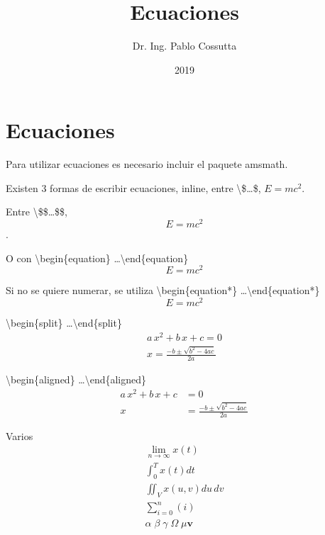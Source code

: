\documentclass[11pt, a4paper]{article}
\title{Ecuaciones}
\author{Dr. Ing. Pablo Cossutta}
\date{2019}
\begin{document}
\maketitle
\section{Ecuaciones}
Para utilizar ecuaciones es necesario incluir el paquete amsmath.

Existen 3 formas de escribir ecuaciones, inline, entre \textbackslash \$\dots \$, $E=mc^2$.

Entre \textbackslash \$\$\dots \$\$, $$E=mc^2$$.

O con \textbackslash begin\{equation\} \dots \textbackslash end\{equation\} 
\begin{equation}
	E=mc^2
\end{equation}

Si no se quiere numerar, se utiliza \textbackslash begin\{equation*\} \dots \textbackslash end\{equation*\} 
\begin{equation*}
	E=mc^2
\end{equation*}

\textbackslash begin\{split\} \dots \textbackslash end\{split\}
\begin{equation}
\begin{split}
	a\,x^2+b\,x+c = 0\\
	x = \frac{-b \pm \sqrt{b^2-4ac}}{2a}
\end{split}
\end{equation}

\textbackslash begin\{aligned\} \dots \textbackslash end\{aligned\}
\begin{equation}
\begin{aligned}
	a\,x^2+b\,x+c &= 0\\
	x &= \frac{-b \pm \sqrt{b^2-4ac}}{2a}
\end{aligned}
\end{equation}

Varios
\begin{equation*}
\begin{split}
	\lim_{n \to\infty} x\left(t\right) \\
	\int_0^T x\left(t\right) dt \\
	\iint_V x\left(u,v\right) du\,dv \\
	\sum_{i=0}^n\left(i\right) \\
	\alpha \; \beta \; \gamma \; \Omega \; \mu \bm{v}
\end{split}
\end{equation*}
\end{document}
